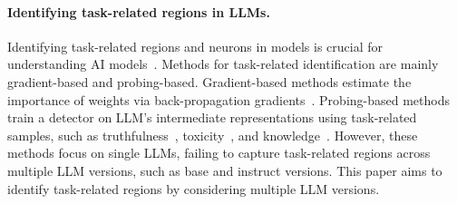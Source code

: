 
\paragraph{Identifying task-related regions in LLMs.} Identifying task-related regions and neurons in models is crucial for understanding AI models~\citep{tjoa2020survey, liu2024towards, ren2024identifying, dang2024explainable}. Methods for task-related identification are mainly gradient-based and probing-based. Gradient-based methods estimate the importance of weights via back-propagation gradients~\cite{springenberg2014striving, sundararajan2017axiomatic, shrikumar2017learning, michel2019sixteen, maini2023can, wang-etal-2023-label, wei2024assessing, liu2024devil}. Probing-based methods train a detector on LLM's intermediate representations using task-related samples, such as truthfulness~\citep{li2023inference, qian2024towards}, toxicity~\cite{lee2024mechanistic}, and knowledge~\cite{burns2022discovering, todd2023function}. However, these methods focus on single LLMs, failing to capture task-related regions across multiple LLM versions, such as base and instruct versions. This paper aims to identify task-related regions by considering multiple LLM versions.

